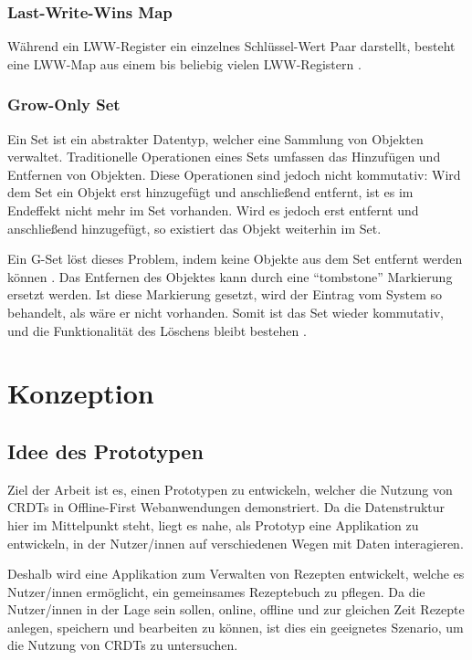 \documentclass[a4paper, 12pt]{scrreprt}
\begin{document}
\subsection{Last-Write-Wins Map}
\label{sec:lwwMap}
\sloppypar
Während ein \ac{LWW-Register} ein einzelnes Schlüssel-Wert Paar darstellt, besteht eine LWW-Map aus einem bis beliebig vielen LWW-Registern \autocite[43]{PhdthesisLwwMap}.


\subsection{Grow-Only Set}
\label{sec:g-set}
Ein Set ist ein abstrakter Datentyp, welcher eine Sammlung von Objekten verwaltet. Traditionelle Operationen eines Sets umfassen das Hinzufügen und Entfernen von Objekten. Diese Operationen sind jedoch nicht kommutativ: Wird dem Set ein Objekt erst hinzugefügt und anschließend entfernt, ist es im Endeffekt nicht mehr im Set vorhanden. Wird es jedoch erst entfernt und anschließend hinzugefügt, so existiert das Objekt weiterhin im Set.

Ein \ac{G-Set} löst dieses Problem, indem keine Objekte aus dem Set entfernt werden können  \autocite[S.17]{ArticlePureOP}. Das Entfernen des Objektes kann durch eine \enquote{tombstone} Markierung ersetzt werden. Ist diese Markierung gesetzt, wird der Eintrag vom System so behandelt, als wäre er nicht vorhanden. Somit ist das Set wieder kommutativ, und die Funktionalität des Löschens bleibt bestehen \autocite[S.7]{InproceedingsTombstone}.


\chapter{Konzeption}

\section{Idee des Prototypen}
Ziel der Arbeit ist es, einen Prototypen zu entwickeln, welcher die Nutzung von \acp{CRDT} in Offline-First Webanwendungen demonstriert. Da die Datenstruktur hier im Mittelpunkt steht, liegt es nahe, als Prototyp eine Applikation zu entwickeln, in der Nutzer/innen auf verschiedenen Wegen mit Daten interagieren.

Deshalb wird eine Applikation zum Verwalten von Rezepten entwickelt, welche es Nutzer/innen ermöglicht, ein gemeinsames Rezeptebuch zu pflegen. Da die Nutzer/innen in der Lage sein sollen, online, offline und zur gleichen Zeit Rezepte anlegen, speichern und bearbeiten zu können, ist dies ein geeignetes Szenario, um die Nutzung von \acp{CRDT} zu untersuchen. 
\end{document}
